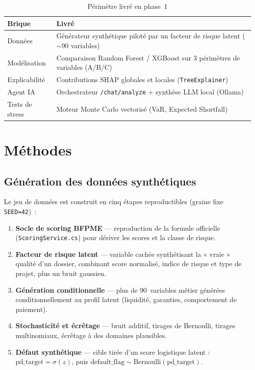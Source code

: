 \documentclass[a4paper,11pt]{article}
\begin{document}
\begin{table}[H]
\centering
\caption{Périmètre livré en phase~1}
\renewcommand{\arraystretch}{1.3}
\begin{tabularx}{\textwidth}{@{}l Y@{}}
\toprule
\textbf{Brique} & \textbf{Livré} \\
\midrule
Données        & Générateur synthétique piloté par un facteur de risque latent ($\sim$90 variables) \\
Modélisation   & Comparaison Random Forest / XGBoost sur 3 périmètres de variables (A/B/C) \\
Explicabilité  & Contributions SHAP globales et locales (\texttt{TreeExplainer}) \\
Agent IA       & Orchestrateur \texttt{/chat/analyze} + synthèse LLM local (Ollama) \\
Tests de stress& Moteur Monte Carlo vectorisé (VaR, Expected Shortfall) \\
\bottomrule
\end{tabularx}
\end{table}

\section{Méthodes}

\subsection{Génération des données synthétiques}

Le jeu de données est construit en cinq étapes reproductibles (graine fixe \texttt{SEED=42})~:
\begin{enumerate}[leftmargin=1.8em]
  \item \textbf{Socle de scoring BFPME} — reproduction de la formule officielle
        (\texttt{ScoringService.cs}) pour dériver les scores et la classe de risque.
  \item \textbf{Facteur de risque latent} — variable cachée synthétisant la « vraie » qualité
        d'un dossier, combinant score normalisé, indice de risque et type de projet, plus un
        bruit gaussien.
  \item \textbf{Génération conditionnelle} — plus de 90~variables métier générées
        conditionnellement au profil latent (liquidité, garanties, comportement de paiement).
  \item \textbf{Stochasticité et écrêtage} — bruit additif, tirages de Bernoulli, tirages
        multinomiaux, écrêtage à des domaines plausibles.
  \item \textbf{Défaut synthétique} — cible tirée d'un score logistique latent :
        $\text{pd\_target}=\sigma(z)$, puis $\text{default\_flag}\sim\mathrm{Bernoulli}(\text{pd\_target})$.
\end{enumerate}
\end{document}
